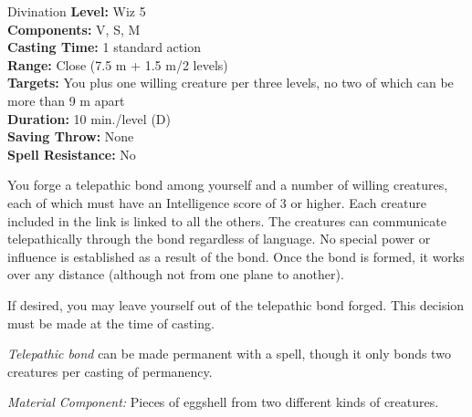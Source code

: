 {Divination}
{
	\textbf{Level:}
	Wiz 5\\
	\textbf{Components:}
	V, S, M\\
	\textbf{Casting Time:}
	1 standard action\\
	\textbf{Range:}
	Close (7.5 m + 1.5 m/2 levels)\\
	\textbf{Targets:}
	You plus one willing creature per three levels, no two of which can be more than 9 m apart\\
	\textbf{Duration:}
	10 min./level (D)\\
	\textbf{Saving Throw:}
	None\\
	\textbf{Spell Resistance:}
	No\\
}
{
	You forge a telepathic bond among yourself and a number of willing creatures, each of which must have an Intelligence score of 3 or higher. Each creature included in the link is linked to all the others. The creatures can communicate telepathically through the bond regardless of language. No special power or influence is established as a result of the bond. Once the bond is formed, it works over any distance (although not from one plane to another).

	If desired, you may leave yourself out of the telepathic bond forged. This decision must be made at the time of casting.

	\emph{Telepathic bond} can be made permanent with a  spell, though it only bonds two creatures per casting of permanency.

	\textit{Material Component:}
	Pieces of eggshell from two different kinds of creatures.

}
